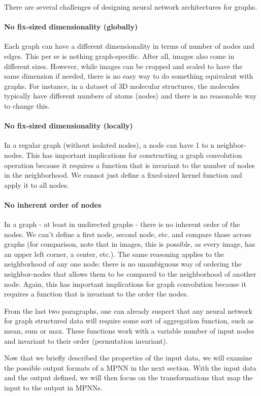 There are several challenges of designing neural network architectures for graphs.

\paragraph{No fix-sized dimensionality (globally)}
Each graph can have a different dimensionality in terms of number of nodes and edges. This per se is nothing graph-specific. After all, images also come in different sizes. However, while images can be cropped and scaled to have the same dimension if needed, there is no easy way to do something equivalent with graphs. For instance, in a dataset of 3D molecular structures, the molecules typically have different numbers of atoms (nodes) and there is no reasonable way to change this.
\paragraph{No fix-sized dimensionality (locally)}
In a regular graph (without isolated nodes), a node can have 1 to n neighbor-nodes. This has important implications for constructing a graph convolution operation because it requires a function that is invariant to the number of nodes in the neighborhood. We cannot just define a fixed-sized kernel function and apply it to all nodes.
\paragraph{No inherent order of nodes}
In a graph - at least in undirected graphs - there is no inherent order of the nodes. We can't define a first node, second node, etc. and compare those across graphs (for comparison, note that in images, this is possible, as every image, has an upper left corner, a center, etc.). The same reasoning applies to the neighborhood of any one node: there is no unambiguous way of ordering the neighbor-nodes that allows them to be compared to the neighborhood of another node. Again, this has important implications for graph convolution because it requires a function that is invariant to the order the nodes.

From the last two paragraphs, one can already suspect that any neural network for graph structured data will require some sort of aggregation function, such as mean, sum or max. These functions work with a variable number of input nodes and invariant to their order (permutation invariant).

Now that we briefly described the properties of the input data, we will examine the possible output formats of a MPNN in the next section. With the input data and the output defined, we will then focus on the transformations that map the input to the output in MPNNs.

